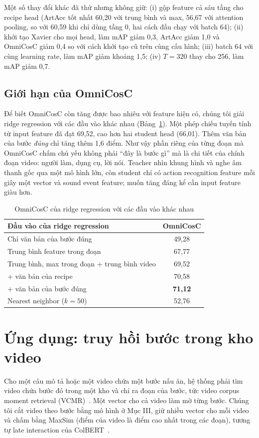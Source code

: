 \documentclass{IEEEtran}
\begin{document}
Một số thay đổi khác đã thử nhưng không giữ: (i) gộp feature cả sáu tầng cho recipe head (ArtAcc tốt nhất 60,20 với trung bình và max, 56,67 với attention pooling, so với 60,59 khi chỉ dùng tầng 0, hai cách đầu chạy với batch 64); (ii) khởi tạo Xavier cho mọi head, làm mAP giảm 0,3, ArtAcc giảm 1,0 và OmniCosC giảm 0,4 so với cách khởi tạo cũ trên cùng cấu hình; (iii) batch 64 với cùng learning rate, làm mAP giảm khoảng 1,5; (iv) $T = 320$ thay cho 256, làm mAP giảm 0,7.

\subsection{Giới hạn của OmniCosC}
Để biết OmniCosC còn tăng được bao nhiêu với feature hiện có, chúng tôi giải ridge regression với các đầu vào khác nhau (Bảng~\ref{tab:ceiling}). Một phép chiếu tuyến tính từ input feature đã đạt 69,52, cao hơn hai student head (66,01). Thêm văn bản của bước \emph{đúng} chỉ tăng thêm 1,6 điểm. Như vậy phần riêng của từng đoạn mà OmniCosC chấm chủ yếu không phải ``đây là bước gì'' mà là chi tiết của chính đoạn video: người làm, dụng cụ, lời nói. Teacher nhìn khung hình và nghe âm thanh gốc qua một mô hình lớn, còn student chỉ có action recognition feature mỗi giây một vector và sound event feature; muốn tăng đáng kể cần input feature giàu hơn.

\begin{table}[t]
\caption{OmniCosC của ridge regression với các đầu vào khác nhau}
\label{tab:ceiling}
\centering
\begin{tabular}{|l|c|}
\hline
Đầu vào của ridge regression & OmniCosC \\
\hline
Chỉ văn bản của bước đúng & 49,28 \\
Trung bình feature trong đoạn & 67,77 \\
Trung bình, max trong đoạn + trung bình video & 69,52 \\
\quad + văn bản của recipe & 70,58 \\
\quad + văn bản của bước đúng & \textbf{71,12} \\
\hline
Nearest neighbor ($k = 50$) & 52,76 \\
\hline
\end{tabular}
\end{table}

\section{Ứng dụng: truy hồi bước trong kho video}
\label{sec:retrieval}
Cho một câu mô tả hoặc một video chứa một bước nấu ăn, hệ thống phải tìm video chứa bước đó trong một kho và chỉ ra đoạn của bước, tức video corpus moment retrieval (VCMR)~\cite{tvr}. Một vector cho cả video làm mờ từng bước. Chúng tôi cắt video theo bước bằng mô hình ở Mục III, giữ nhiều vector cho mỗi video và chấm bằng MaxSim (điểm của video là điểm cao nhất trong các đoạn), tương tự late interaction của ColBERT~\cite{colbert}.
\end{document}
